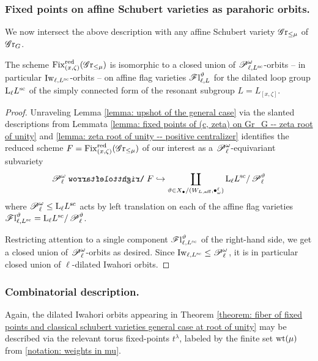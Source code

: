 \subsubsection{Fixed points on affine Schubert varieties as parahoric orbits.}
We now intersect the above description with any affine Schubert variety $\operatorname{\mathscr{G}r}_{\leq \mu}$ of $\operatorname{\mathscr{G}r}_G$.
\begin{theorem}\label{theorem: fiber of fixed points and classical schubert varieties general case at root of unity}
The scheme $\operatorname{Fix}^{\operatorname{red}}_{(x, \zeta)}(\operatorname{\mathscr{G}r}_{\leq \mu})$ is isomorphic to a closed union of $\operatorname{\mathscr{P}}_{\ell, L^{\mathrm{sc}}}^{\omega}$-orbits -- in particular $\operatorname{\mathrm{Iw}}_{\ell, L^{\mathrm{sc}}}$-orbits -- on affine flag varieties $\operatorname{\mathscr{F}l}_{\ell, L}^{\vartheta}$ for the dilated loop group $\mathrm{L}_{\ell} L^{\mathrm{sc}}$ of the simply connected form of the resonant subgroup $L = L_{[x, \zeta]}$.
\end{theorem}
\begin{proof}
Unraveling Lemma \ref{lemma: upshot of the general case} via the slanted descriptions from Lemmata \ref{lemma: fixed points of (c, zeta) on Gr_G -- zeta root of unity} and \ref{lemma: zeta root of unity -- positive centralizer} identifies the reduced scheme
$F = \operatorname{Fix}^{\operatorname{red}}_{(x, \zeta)}(\operatorname{\mathscr{G}r}_{\leq \mu})$
of our interest as a $\operatorname{\mathscr{P}}_{\ell}^{\omega}$-equivariant subvariety
\begin{equation*}\label{equation: B-equivariant closed immersion into classical flag varieties -- zeta rot of unity}
\eP_{\ell}^{\omega} \acts F \hookrightarrow \coprod_{\vartheta \in X_{\bullet}/(W_{L, \aff}, \bullet^{\ell}_{\omega})} \lo_{\ell} L^{\sc}/\eP_{\ell}^{\vartheta}   
\end{equation*}
where $\operatorname{\mathscr{P}}_{\ell}^{\omega} \leq \mathrm{L}_{\ell} L^{\mathrm{sc}}$ acts by left translation on each of the affine flag varieties $\operatorname{\mathscr{F}l}_{\ell, L^{\mathrm{sc}}}^{\vartheta} = \mathrm{L}_{\ell} L^{\mathrm{sc}}/\operatorname{\mathscr{P}}_{\ell}^{\vartheta}$.

Restricting attention to a single component $\operatorname{\mathscr{F}l}_{\ell, L^{\mathrm{sc}}}^{\vartheta}$ of the right-hand side, we get a closed union of $\operatorname{\mathscr{P}}_{\ell}^{\omega}$-orbits as desired. Since $\operatorname{\mathrm{Iw}}_{\ell, L^{\mathrm{sc}}} \leq \operatorname{\mathscr{P}}_{\ell}^{\omega}$, it is in particular closed union of $\ell$-dilated Iwahori orbits.
\end{proof}


\subsubsection{Combinatorial description.}
Again, the dilated Iwahori orbits appearing in Theorem \ref{theorem: fiber of fixed points and classical schubert varieties general case at root of unity} may be described via the relevant torus fixed-points $t^{\lambda}$, labeled by the finite set $\operatorname{wt}(\mu)$ from \eqref{notation: weights in mu}.

